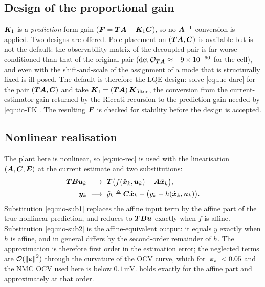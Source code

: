 \subsection{Design of the proportional gain}
$\bm{K}_1$ is a \emph{prediction}-form gain ($\bm{F} = \bm{T}\bm{A}-\bm{K}_1\bm{C}$), so no $\bm{A}^{-1}$ conversion is
applied.  Two designs are offered.  Pole placement on $(\bm{T}\bm{A},\bm{C})$ is available but is not the
default: the observability matrix of the decoupled pair is far worse conditioned than that of the
original pair ($\det\mathcal{O}_{\bm{T}\bm{A}}\approx-9\times10^{-60}$ for the cell), and even with the
shift-and-scale of  the assignment of a mode that is structurally fixed is
ill-posed.  The default is therefore the LQE design: solve \eqref{eq:lue-dare} for the pair
$(\bm{T}\bm{A},\bm{C})$ and take $\bm{K}_1 = (\bm{T}\bm{A})\,\bm{K}_{\mathrm{filter}}$, the conversion from the
current-estimator gain returned by the Riccati recursion to the prediction gain needed by
\eqref{eq:uio-FK}.  The resulting $\bm{F}$ is checked for stability before the design is accepted.

\subsection{Nonlinear realisation}
\label{sec:uio-nonlin}
The plant here is nonlinear, so \eqref{eq:uio-rec} is used with the linearisation $(\bm{A},\bm{C},\bm{E})$
at the current estimate and two substitutions:
\begin{align}
\bm{T}\bm{B}\bm{u}_k &\ \longrightarrow\ \bm{T}\big(f(\hat{\bm{x}}_k,\bm{u}_k) - \bm{A}\hat{\bm{x}}_k\big) ,
\label{eq:uio-sub1}\\
\bm{y}_k &\ \longrightarrow\ \tilde{y}_k \triangleq \bm{C}\hat{\bm{x}}_k + \big(y_k - h(\hat{\bm{x}}_k,\bm{u}_k)\big) .
\label{eq:uio-sub2}
\end{align}
Substitution \eqref{eq:uio-sub1} replaces the affine input term by the affine part of the true
nonlinear prediction, and reduces to $\bm{T}\bm{B}\bm{u}$ exactly when $f$ is affine.  Substitution
\eqref{eq:uio-sub2} is the affine-equivalent output: it equals $y$ exactly when $h$ is affine, and
in general differs by the second-order remainder of $h$.  The approximation is therefore first
order in the estimation error; the neglected terms are $\mathcal{O}(\left\lVert \bm{\varepsilon} \right\rVert^2)$ through the
curvature of the OCV curve, which for $|\bm{\varepsilon}_{z}|<0.05$ and the NMC OCV used here is below
$0.1$\,mV.   holds exactly for the affine part and approximately at that order.

